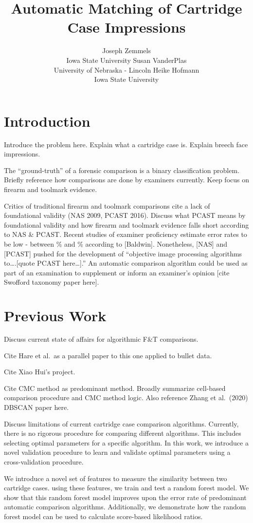 \documentclass[
]{jdssv}
\author{
Joseph Zemmels\\Iowa State University \And Susan VanderPlas\\University
of Nebraska - Lincoln \And Heike Hofmann\\Iowa State University
}
\title{Automatic Matching of Cartridge Case Impressions}
\begin{document}
\hypertarget{introduction}{%
\section{Introduction}\label{introduction}}

Introduce the problem here. Explain what a cartridge case is. Explain
breech face impressions.

The ``ground-truth'' of a forensic comparison is a binary classification
problem. Briefly reference how comparisons are done by examiners
currently. Keep focus on firearm and toolmark evidence.

Critics of traditional firearm and toolmark comparisons cite a lack of
foundational validity (NAS 2009, PCAST 2016). Discuss what PCAST means
by foundational validity and how firearm and toolmark evidence falls
short according to NAS \& PCAST. Recent studies of examiner proficiency
estimate error rates to be low - between \% and \% according to
{[}Baldwin{]}. Nonetheless, {[}NAS{]} and {[}PCAST{]} pushed for the
development of ``objective image processing algorithms to\ldots.{[}quote
PCAST here\ldots{]}.'' An automatic comparison algorithm could be used
as part of an examination to supplement or inform an examiner's opinion
{[}cite Swofford taxonomy paper here{]}.

\hypertarget{previous-work}{%
\section{Previous Work}\label{previous-work}}

Discuss current state of affairs for algorithmic F\&T comparisons.

Cite Hare et al.~as a parallel paper to this one applied to bullet data.

Cite Xiao Hui's project.

Cite CMC method as predominant method. Broadly summarize cell-based
comparison procedure and CMC method logic. Also reference Zhang et
al.~(2020) DBSCAN paper here.

Discuss limitations of current cartridge case comparison algorithms.
Currently, there is no rigorous procedure for comparing different
algorithms. This includes selecting optimal parameters for a specific
algorithm. In this work, we introduce a novel validation procedure to
learn and validate optimal parameters using a cross-validation
procedure.

We introduce a novel set of features to measure the similarity between
two cartridge cases. using these features, we train and test a random
forest model. We show that this random forest model improves upon the
error rate of predominant automatic comparison algorithms. Additionally,
we demonstrate how the random forest model can be used to calculate
score-based likelihood ratios.
\end{document}
